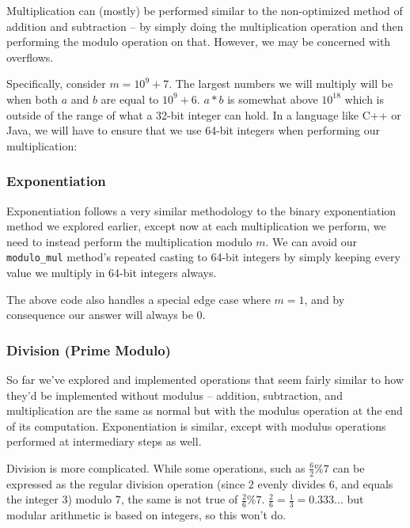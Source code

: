 Multiplication can (mostly) be performed similar to the non-optimized method of addition and subtraction -- by simply doing the multiplication operation and then performing the modulo operation on that. However, we may be concerned with overflows.

Specifically, consider $m = 10^9 + 7$. The largest numbers we will multiply will be when both $a$ and $b$ are equal to $10^9 + 6$. $a * b$ is somewhat above $10^{18}$ which is outside of the range of what a 32-bit integer can hold. In a language like C++ or Java, we will have to ensure that we use 64-bit integers when performing our multiplication:


\subsubsection{Exponentiation}

Exponentiation follows a very similar methodology to the binary exponentiation method we explored earlier, except now at each multiplication we perform, we need to instead perform the multiplication modulo $m$. We can avoid our \texttt{modulo_mul} method's repeated casting to 64-bit integers by simply keeping every value we multiply in 64-bit integers always.


The above code also handles a special edge case where $m = 1$, and by consequence our answer will always be $0$.

\subsubsection{Division (Prime Modulo)}

So far we've explored and implemented operations that seem fairly similar to how they'd be implemented without modulus -- addition, subtraction, and multiplication are the same as normal but with the modulus operation at the end of its computation. Exponentiation is similar, except with modulus operations performed at intermediary steps as well.

Division is more complicated. While some operations, such as $\frac{6}{2} \% 7$ can be expressed as the regular division operation (since 2 evenly divides 6, and equals the integer 3) modulo 7, the same is not true of $\frac{2}{6} \% 7$. $\frac{2}{6} = \frac{1}{3} = 0.333...$ but modular arithmetic is based on integers, so this won't do.

